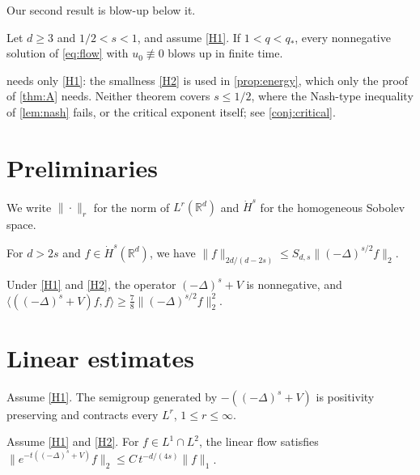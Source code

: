\documentclass[11pt]{article}
\numberwithin{equation}{section}
\newcommand{\R}{\mathbb{R}}
\newcommand{\qc}{q_{*}}
\begin{document}
Our second result is blow-up below it.

\begin{main}\label{thm:B}
Let $d \geq 3$ and $1/2 < s < 1$, and assume \eqref{H1}. If $1 < q < \qc$, every nonnegative solution of \eqref{eq:flow} with $u_0 \not\equiv 0$ blows up in finite time.
\end{main}

 needs only \eqref{H1}: the smallness \eqref{H2} is used in \cref{prop:energy}, which only the proof of \cref{thm:A} needs. Neither theorem covers $s \leq 1/2$, where the Nash-type inequality of \cref{lem:nash} fails, or the critical exponent itself; see \cref{conj:critical}.

\section{Preliminaries}\label{sec:prelim}

We write $\|\cdot\|_r$ for the norm of $L^r(\R^d)$ and $\dot H^s$ for the homogeneous Sobolev space.

\begin{lemma}\label{lem:sobolev}
For $d > 2s$ and $f \in \dot H^s(\R^d)$, we have $\|f\|_{2d/(d-2s)} \leq S_{d,s} \|(-\Delta)^{s/2} f\|_2$.
\end{lemma}

\begin{lemma}\label{lem:hardy}
Under \eqref{H1} and \eqref{H2}, the operator $(-\Delta)^s + V$ is nonnegative, and $\langle ((-\Delta)^s + V) f, f\rangle \geq \frac{7}{8} \|(-\Delta)^{s/2} f\|_2^2$.
\end{lemma}

\section{Linear estimates}\label{sec:linear}

\begin{proposition}\label{prop:semigroup}
Assume \eqref{H1}. The semigroup generated by $-((-\Delta)^s + V)$ is positivity preserving and contracts every $L^r$, $1 \leq r \leq \infty$.
\end{proposition}

\begin{lemma}\label{lem:linear-decay}
Assume \eqref{H1} and \eqref{H2}. For $f \in L^1 \cap L^2$, the linear flow satisfies $\|e^{-t((-\Delta)^s + V)} f\|_2 \leq C\, t^{-d/(4s)} \|f\|_1$.
\end{lemma}
\end{document}
